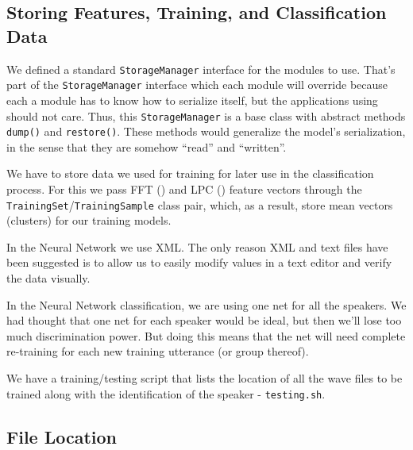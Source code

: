 \subsection{Storing Features, Training, and Classification Data}

We defined a standard \verb+StorageManager+ interface for the modules to use.
That's part of the \verb+StorageManager+ interface which each module will override
because each a module has to know how to serialize itself, but the applications
using {\marf} should not care.
Thus, this \verb+StorageManager+ is a base class with abstract methods \verb+dump()+ and
\verb+restore()+. These methods would generalize the
model's serialization, in the sense that they are somehow ``read'' and ``written''.

We have to store data we used for training for later use in
the classification process. For this we pass FFT () and LPC ()
feature vectors through the \verb+TrainingSet+/\verb+TrainingSample+ class pair,
which, as a result, store mean vectors (clusters) for our training models.

In the Neural Network we use XML. The only reason XML and text files
have been suggested is to allow us to easily modify values in
a text editor and verify the data visually.

In the Neural Network classification, we are using one net for
all the speakers. We had thought that one net for each speaker
would be ideal, but then we'll lose too much discrimination
power. But doing this means that the net will need complete
re-training for each new training utterance (or group thereof).

We have a training/testing script that lists the location of all the wave files to
be trained along with the identification of the speaker - \verb+testing.sh+.





\subsection{File Location}


